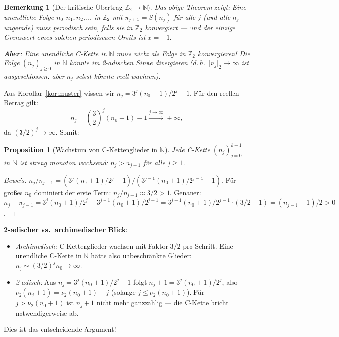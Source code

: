 \documentclass[12pt,a4paper]{article}
\newtheorem{proposition}[definition]{Proposition}
\newtheorem{bemerkung}[definition]{Bemerkung}
\newenvironment{beweis}{\begin{proof}[Beweis]}{\end{proof}}
\newcommand{\vii}{\nu_2}
\newcommand{\N}{\mathbb{N}}
\newcommand{\Ztwo}{\mathbb{Z}_2}     %
\newcommand{\atwo}[1]{\lvert#1\rvert_2}  %
\begin{document}
\begin{bemerkung}[Der kritische Übertrag $\Ztwo \to \N$]
\label{bem:uebertrag}
Das obige Theorem zeigt: Eine unendliche Folge $n_0, n_1, n_2, \ldots$ in $\Ztwo$
mit $n_{j+1} = S(n_j)$ für alle $j$ (und alle $n_j$ ungerade) muss
periodisch sein, falls sie in $\Ztwo$ konvergiert --- und der einzige Grenzwert
eines solchen periodischen Orbits ist $x = -1$.

\textbf{Aber:} Eine unendliche C-Kette in $\N$ muss nicht als Folge in $\Ztwo$
konvergieren! Die Folge $(n_j)_{j \geq 0}$ in $\N$ könnte im 2-adischen Sinne
divergieren (d.\,h.\ $\atwo{n_j} \to \infty$ ist ausgeschlossen, aber
$n_j$ selbst könnte reell wachsen).
\end{bemerkung}

Aus Korollar~\ref{kor:muster} wissen wir $n_j = 3^j(n_0+1)/2^j - 1$.
Für den reellen Betrag gilt:
\[
  n_j = \left(\frac{3}{2}\right)^j (n_0+1) - 1 \xrightarrow{j\to\infty} +\infty,
\]
da $(3/2)^j \to \infty$. Somit:

\begin{proposition}[Wachstum von C-Kettenglieder in $\N$]
\label{prop:wachstum}
Jede C-Kette $(n_j)_{j=0}^{k-1}$ in $\N$ ist streng monoton wachsend:
$n_j > n_{j-1}$ für alle $j \geq 1$.
\end{proposition}

\begin{beweis}
$n_j/n_{j-1} = (3^j(n_0+1)/2^j - 1)/(3^{j-1}(n_0+1)/2^{j-1} - 1)$.
Für großes $n_0$ dominiert der erste Term: $n_j/n_{j-1} \approx 3/2 > 1$.
Genauer: $n_j - n_{j-1} = 3^j(n_0+1)/2^j - 3^{j-1}(n_0+1)/2^{j-1}
= 3^{j-1}(n_0+1)/2^{j-1} \cdot (3/2 - 1) = (n_{j-1}+1)/2 > 0$.
\end{beweis}

\begin{tcolorbox}[adisch]
\textbf{2-adischer vs.\ archimedischer Blick:}

\begin{itemize}
  \item \textit{Archimedisch:} C-Kettenglieder wachsen mit Faktor $3/2$
    pro Schritt. Eine unendliche C-Kette in $\N$ hätte also unbeschränkte
    Glieder: $n_j \sim (3/2)^j n_0 \to \infty$.
  \item \textit{2-adisch:} Aus $n_j = 3^j(n_0+1)/2^j - 1$ folgt
    $n_j + 1 = 3^j(n_0+1)/2^j$, also
    $\vii(n_j+1) = \vii(n_0+1) - j$ (solange $j \leq \vii(n_0+1)$).
    Für $j > \vii(n_0+1)$ ist $n_j + 1$ nicht mehr ganzzahlig --- die
    C-Kette bricht notwendigerweise ab.
\end{itemize}

Dies ist das entscheidende Argument!
\end{tcolorbox}
\end{document}
